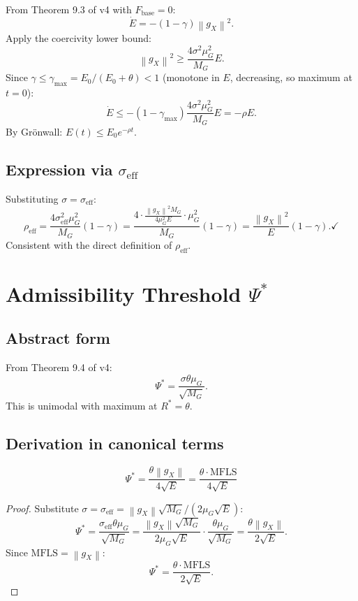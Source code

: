 \documentclass[11pt,a4paper]{article}
\theoremstyle{definition}
\newcommand{\norm}[1]{\left\|#1\right\|}
\newcommand{\Fbase}{F_{\mathrm{base}}}
\newcommand{\gX}{g_X}
\newcommand{\mfls}{\mathrm{MFLS}}
\begin{document}
From Theorem 9.3 of v4 with $\Fbase = 0$:
\[
\dot E = -(1-\gamma)\norm{\gX}^2.
\]
Apply the coercivity lower bound:
\[
\norm{\gX}^2 \geq \frac{4\sigma^2\mu_G^2}{M_G}E.
\]
Since $\gamma \leq \gamma_\mathrm{max} = E_0/(E_0+\theta) < 1$ (monotone in $E$, decreasing, so maximum at $t=0$):
\[
\dot E \leq -(1-\gamma_\mathrm{max})\frac{4\sigma^2\mu_G^2}{M_G}E = -\rho E.
\]
By Grönwall: $E(t) \leq E_0 e^{-\rho t}$.

\subsection{Expression via $\sigma_\mathrm{eff}$}

Substituting $\sigma = \sigma_\mathrm{eff}$:
\[
\rho_\mathrm{eff} = \frac{4\sigma_\mathrm{eff}^2\mu_G^2}{M_G}(1-\gamma)
= \frac{4\cdot\frac{\norm{\gX}^2 M_G}{4\mu_G^2 E}\cdot\mu_G^2}{M_G}(1-\gamma)
= \frac{\norm{\gX}^2}{E}(1-\gamma). \checkmark
\]
Consistent with the direct definition of $\rho_\mathrm{eff}$.

\section{Admissibility Threshold $\Psi^*$}

\subsection{Abstract form}

From Theorem 9.4 of v4:
\[
\Psi^* = \frac{\sigma\theta\mu_G}{\sqrt{M_G}}.
\]
This is unimodal with maximum at $R^* = \theta$.

\subsection{Derivation in canonical terms}

\begin{lockedbox}
\[
\Psi^* = \frac{\theta\norm{\gX}}{4\sqrt{E}} = \frac{\theta\cdot\mfls}{4\sqrt{E}}
\]
\end{lockedbox}

\begin{proof}
Substitute $\sigma = \sigma_\mathrm{eff} = \norm{\gX}\sqrt{M_G}/(2\mu_G\sqrt{E})$:
\[
\Psi^* = \frac{\sigma_\mathrm{eff}\theta\mu_G}{\sqrt{M_G}}
= \frac{\norm{\gX}\sqrt{M_G}}{2\mu_G\sqrt{E}}\cdot\frac{\theta\mu_G}{\sqrt{M_G}}
= \frac{\theta\norm{\gX}}{2\sqrt{E}}.
\]
Since $\mfls = \norm{\gX}$:
\[
\Psi^* = \frac{\theta\cdot\mfls}{2\sqrt{E}}.
\]
\end{proof}
\end{document}
